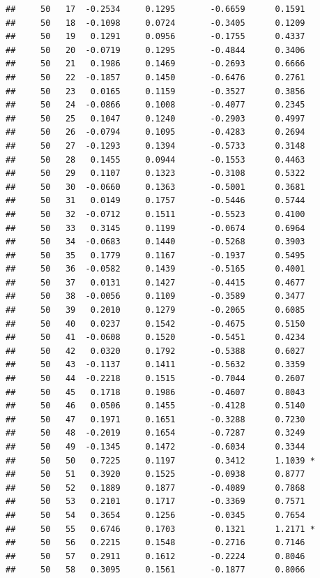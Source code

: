 \documentclass[
]{article}
\begin{document}
\begin{verbatim}
##     50   17  -0.2534     0.1295       -0.6659      0.1591  
##     50   18  -0.1098     0.0724       -0.3405      0.1209  
##     50   19   0.1291     0.0956       -0.1755      0.4337  
##     50   20  -0.0719     0.1295       -0.4844      0.3406  
##     50   21   0.1986     0.1469       -0.2693      0.6666  
##     50   22  -0.1857     0.1450       -0.6476      0.2761  
##     50   23   0.0165     0.1159       -0.3527      0.3856  
##     50   24  -0.0866     0.1008       -0.4077      0.2345  
##     50   25   0.1047     0.1240       -0.2903      0.4997  
##     50   26  -0.0794     0.1095       -0.4283      0.2694  
##     50   27  -0.1293     0.1394       -0.5733      0.3148  
##     50   28   0.1455     0.0944       -0.1553      0.4463  
##     50   29   0.1107     0.1323       -0.3108      0.5322  
##     50   30  -0.0660     0.1363       -0.5001      0.3681  
##     50   31   0.0149     0.1757       -0.5446      0.5744  
##     50   32  -0.0712     0.1511       -0.5523      0.4100  
##     50   33   0.3145     0.1199       -0.0674      0.6964  
##     50   34  -0.0683     0.1440       -0.5268      0.3903  
##     50   35   0.1779     0.1167       -0.1937      0.5495  
##     50   36  -0.0582     0.1439       -0.5165      0.4001  
##     50   37   0.0131     0.1427       -0.4415      0.4677  
##     50   38  -0.0056     0.1109       -0.3589      0.3477  
##     50   39   0.2010     0.1279       -0.2065      0.6085  
##     50   40   0.0237     0.1542       -0.4675      0.5150  
##     50   41  -0.0608     0.1520       -0.5451      0.4234  
##     50   42   0.0320     0.1792       -0.5388      0.6027  
##     50   43  -0.1137     0.1411       -0.5632      0.3359  
##     50   44  -0.2218     0.1515       -0.7044      0.2607  
##     50   45   0.1718     0.1986       -0.4607      0.8043  
##     50   46   0.0506     0.1455       -0.4128      0.5140  
##     50   47   0.1971     0.1651       -0.3288      0.7230  
##     50   48  -0.2019     0.1654       -0.7287      0.3249  
##     50   49  -0.1345     0.1472       -0.6034      0.3344  
##     50   50   0.7225     0.1197        0.3412      1.1039 *
##     50   51   0.3920     0.1525       -0.0938      0.8777  
##     50   52   0.1889     0.1877       -0.4089      0.7868  
##     50   53   0.2101     0.1717       -0.3369      0.7571  
##     50   54   0.3654     0.1256       -0.0345      0.7654  
##     50   55   0.6746     0.1703        0.1321      1.2171 *
##     50   56   0.2215     0.1548       -0.2716      0.7146  
##     50   57   0.2911     0.1612       -0.2224      0.8046  
##     50   58   0.3095     0.1561       -0.1877      0.8066  

\end{verbatim}
\end{document}
